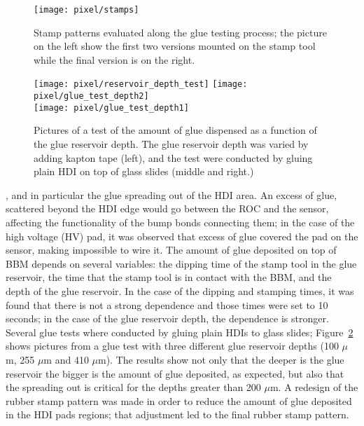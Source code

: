 \begin{figure}[!h]
  \centering  
  \texttt{[image: pixel/stamps]} 
  \caption[Stamp patterns]{Stamp patterns evaluated along the glue testing process; the picture on the left show the first two versions mounted on the stamp tool while the final version is on the right.}\label{fig:stamp_pattern}
\end{figure}

\bit
  \begin{figure}[!h]
  \centering
  \texttt{[image: pixel/reservoir\_depth\_test]}
  \texttt{[image: pixel/glue\_test\_depth2]}\\
  \texttt{[image: pixel/glue\_test\_depth1]}
  \caption[Test of amount of glue deposited.]{Pictures of a test of the amount of glue dispensed as a function of the glue reservoir depth. The glue reservoir depth was varied by adding kapton tape (left), and the test were conducted by gluing plain HDI on top of glass slides (middle and right.)}\label{fig:glue_test_depth}
\end{figure}

\item {}, and in particular the glue spreading out of the HDI area. An excess of glue, scattered beyond the HDI edge would go between the ROC and the sensor, affecting the functionality of the bump bonds connecting them; in the case of the high voltage (HV) pad, it was observed that excess of glue covered the pad on the sensor, making impossible to wire it. The amount of glue deposited on  top of BBM depends on several variables: the dipping time of the stamp tool in the glue reservoir, the time that the stamp tool is in contact with the BBM, and the depth of the glue reservoir. In the case of the dipping and stamping times, it was found that there is not a strong dependence and those times were set to 10 seconds; in the case of the glue reservoir depth, the dependence is stronger. Several glue tests where conducted by gluing plain HDIs to glass slides; Figure~\ref{fig:glue_test_depth} shows pictures from a glue test with three different glue reservoir depths (100 $\mu$m, 255 $\mu$m and 410 $\mu$m). The results show not only that the deeper is the glue reservoir the bigger is the amount of glue deposited, as expected, but also that the spreading out is critical for the depths greater than 200 $\mu$m. A redesign of the rubber stamp pattern was made in order to reduce the amount of glue deposited in the HDI pads regions; that adjustment led to the final rubber stamp pattern.

